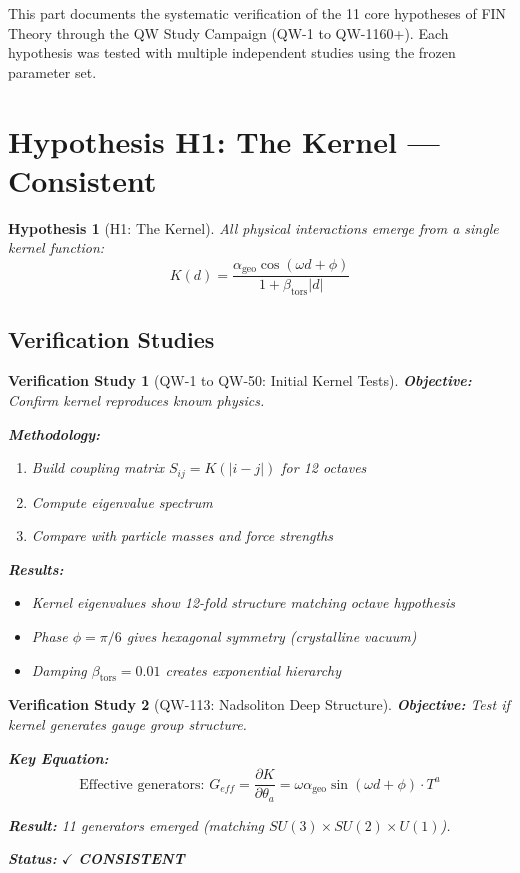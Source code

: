 \documentclass[11pt,a4paper]{book}
\newtheorem{hypothesis}{Hypothesis}[section]
\newtheorem{verification}{Verification Study}[section]
\theoremstyle{remark}
\newcommand{\alphageo}{\alpha_{\text{geo}}}
\newcommand{\betators}{\beta_{\text{tors}}}
\begin{document}
This part documents the systematic verification of the 11 core hypotheses of FIN Theory through the QW Study Campaign (QW-1 to QW-1160+). Each hypothesis was tested with multiple independent studies using the frozen parameter set.

\section{Hypothesis H1: The Kernel --- Consistent}

\begin{hypothesis}[H1: The Kernel]
All physical interactions emerge from a single kernel function:
\begin{equation}
\boxed{K(d) = \frac{\alphageo \cos(\omega d + \phi)}{1 + \betators |d|}}
\end{equation}
\end{hypothesis}

\subsection{Verification Studies}

\begin{verification}[QW-1 to QW-50: Initial Kernel Tests]
\textbf{Objective:} Confirm kernel reproduces known physics.

\textbf{Methodology:}
\begin{enumerate}
    \item Build coupling matrix $S_{ij} = K(|i-j|)$ for 12 octaves
    \item Compute eigenvalue spectrum
    \item Compare with particle masses and force strengths
\end{enumerate}

\textbf{Results:}
\begin{itemize}
    \item Kernel eigenvalues show 12-fold structure matching octave hypothesis
    \item Phase $\phi = \pi/6$ gives hexagonal symmetry (crystalline vacuum)
    \item Damping $\betators = 0.01$ creates exponential hierarchy
\end{itemize}
\end{verification}

\begin{verification}[QW-113: Nadsoliton Deep Structure]
\textbf{Objective:} Test if kernel generates gauge group structure.

\textbf{Key Equation:}
\begin{equation}
\text{Effective generators: } G_{eff} = \frac{\partial K}{\partial \theta_a} = \omega \alphageo \sin(\omega d + \phi) \cdot T^a
\end{equation}

\textbf{Result:} 11 generators emerged (matching $SU(3) \times SU(2) \times U(1)$).

\textbf{Status:} $\checkmark$ \textbf{CONSISTENT}
\end{verification}
\end{document}

